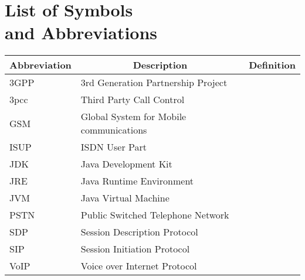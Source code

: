 

\chapter[List of Symbols and Abbreviations]{List of Symbols\\ and Abbreviations}

\begin{center}
\small
\begin{longtable}{lp{3.0in}c}
\toprule
\multicolumn{1}{c}{Abbreviation}
                & \multicolumn{1}{c}{Description}
                                & \multicolumn{1}{c}{Definition}\\ \midrule\addlinespace[2pt] \endhead
\bottomrule\endfoot
3GPP			& 3rd Generation Partnership Project 		& \pref{sym:3GPP}\\
3pcc			& Third Party Call Control						& \pref{sym:3pcc}\\
GSM			& Global System for Mobile communications & \pref{sym:GSM}\\
ISUP			& ISDN User Part									& \pref{sym:ISUP}\\
JDK			& Java Development Kit        				& \pref{sym:JDK}\\
JRE			& Java Runtime Environment        			& \pref{sym:JRE}\\
JVM			& Java Virtual Machine        				& \pref{sym:JVM}\\
PSTN			& Public Switched Telephone Network			& \pref{sym:PSTN}\\
SDP			& Session Description Protocol				& \pref{sym:SDP}\\
SIP			& Session Initiation Protocol					& \pref{sym:SIP}\\
VoIP			& Voice over Internet Protocol				& \pref{sym:VoIP}\\




\end{longtable}
\end{center}

